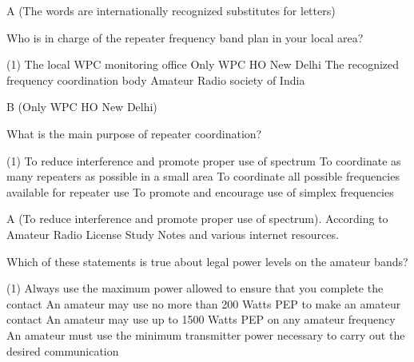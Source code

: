 \documentclass[a4paper]{article}
\begin{document}
\begin{solution}
	A (The words are internationally recognized substitutes for letters)
\end{solution}

\vspace{5mm}



\begin{question}Who is in charge of the repeater frequency band plan in your local area?
	\begin{tasks}(1)
		\task The local WPC monitoring office
		\task Only WPC HO New Delhi
		\task The recognized frequency coordination body
		\task Amateur Radio society of India
	\end{tasks}
\end{question}

\begin{solution}
	B (Only WPC HO New Delhi)
\end{solution}

\vspace{5mm}



\begin{question}What is the main purpose of repeater coordination?
	\begin{tasks}(1)
		\task To reduce interference and promote proper use of spectrum
		\task To coordinate as many repeaters as possible in a small area
		\task To coordinate all possible frequencies available for repeater use
		\task To promote and encourage use of simplex frequencies
	\end{tasks}
\end{question}

\begin{solution}
	A (To reduce interference and promote proper use of spectrum). According to \apostrophe{}Amateur Radio License Study Notes\apostrophe{} and various internet resources.
\end{solution}

\vspace{5mm}



\begin{question}Which of these statements is true about legal power levels on the amateur bands?
	\begin{tasks}(1)
		\task Always use the maximum power allowed to ensure that you complete the contact
		\task An amateur may use no more than 200 Watts PEP to make an amateur contact
		\task An amateur may use up to 1500 Watts PEP on any amateur frequency
		\task An amateur must use the minimum transmitter power necessary to carry out the desired communication
	\end{tasks}
\end{question}
\end{document}
